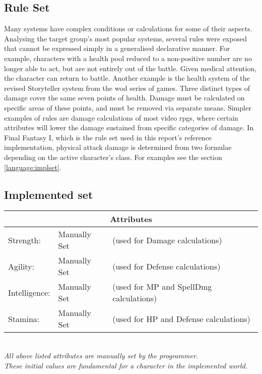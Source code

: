 \subsection{\langname{} Rule Set}
\label{language:ruleset}
Many systems have complex conditions or calculations for some of their aspects.
Analysing the target group's most popular systems, several rules were exposed that cannot be expressed simply in a generalised declarative manner.
For example, characters with a health pool reduced to a non-positive number are no longer able to act, but are not entirely out of the battle.
Given medical attention, the character can return to battle.
Another example is the health system of the revised Storyteller system from the \ac{wod} series of games. Three distinct types of damage cover the same seven points of health. Damage must be calculated on specific areas of these points, and must be removed via separate means.
Simpler examples of rules are damage calculations of most video \ac{rpgs},
where certain attributes will lower the damage sustained from specific categories of damage. In Final Fantasy I, which is the rule set used in this report's reference implementation, physical attack damage is determined from two formulae depending on the active character's class. For examples see the section \vref{language:implset}.

\subsection{Implemented set}
\label{language:implset}
\begin{center}
\begin{tabular}{|l l l|}
\hline
\multicolumn{3}{|c|}{\textbf{Attributes}}\\
\hline
Strength: & Manually Set & (used for Damage calculations)\\
\hline
Agility: & Manually Set	 & (used for Defense calculations)\\
\hline
Intelligence: & Manually Set & (used for MP and SpellDmg calculations)\\
\hline
Stamina: & Manually Set & (used for HP and Defense calculations)\\
\hline
\end{tabular}\\
\emph{All above listed attributes are manually set by the programmer.\\ These initial values are fundamental for a character in the implemented world.}
\end{center}

